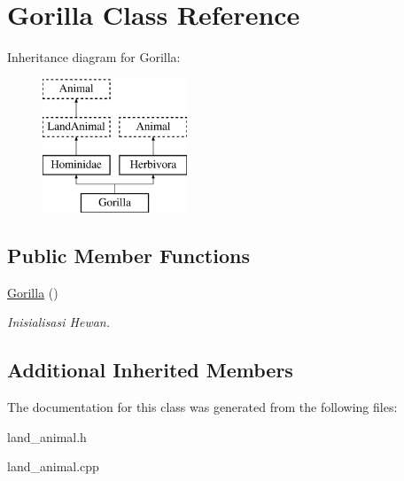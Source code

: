 \hypertarget{class_gorilla}{}\section{Gorilla Class Reference}
\label{class_gorilla}
Inheritance diagram for Gorilla\+:\begin{figure}[H]
\begin{center}
\leavevmode
\includegraphics[height=4.000000cm]{class_gorilla}
\end{center}
\end{figure}
\subsection*{Public Member Functions}
\begin{DoxyCompactItemize}
\item 
\hyperlink{class_gorilla_a01f4f53de267d241d46256ce1bb3cc3a}{Gorilla} ()\hypertarget{class_gorilla_a01f4f53de267d241d46256ce1bb3cc3a}{}\label{class_gorilla_a01f4f53de267d241d46256ce1bb3cc3a}

\begin{DoxyCompactList}\small\item\em Inisialisasi Hewan. \end{DoxyCompactList}\end{DoxyCompactItemize}
\subsection*{Additional Inherited Members}


The documentation for this class was generated from the following files\+:\begin{DoxyCompactItemize}
\item 
land\+\_\+animal.\+h\item 
land\+\_\+animal.\+cpp\end{DoxyCompactItemize}

